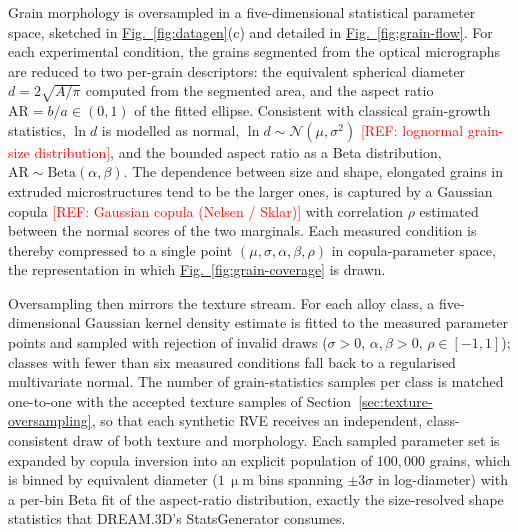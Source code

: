 \documentclass[preprint,12pt]{elsarticle}
\newcommand{\figref}[1]{\hyperref[#1]{Fig.~\ref*{#1}}}
\newcommand{\refneeded}[1]{\textcolor{red}{[REF: #1]}} %
\begin{document}
Grain morphology is oversampled in a five-dimensional statistical parameter space, sketched in \figref{fig:datagen}(c) and detailed in \figref{fig:grain-flow}. For each experimental condition, the grains segmented from the optical micrographs are reduced to two per-grain descriptors: the equivalent spherical diameter $d = 2\sqrt{A/\pi}$ computed from the segmented area, and the aspect ratio $\mathrm{AR} = b/a \in (0,1)$ of the fitted ellipse. Consistent with classical grain-growth statistics, $\ln d$ is modelled as normal, $\ln d \sim \mathcal{N}(\mu, \sigma^2)$ \refneeded{lognormal grain-size distribution}, and the bounded aspect ratio as a Beta distribution, $\mathrm{AR} \sim \mathrm{Beta}(\alpha, \beta)$. The dependence between size and shape, elongated grains in extruded microstructures tend to be the larger ones, is captured by a Gaussian copula \refneeded{Gaussian copula (Nelsen / Sklar)} with correlation $\rho$ estimated between the normal scores of the two marginals. Each measured condition is thereby compressed to a single point $(\mu, \sigma, \alpha, \beta, \rho)$ in copula-parameter space, the representation in which \figref{fig:grain-coverage} is drawn.

Oversampling then mirrors the texture stream. For each alloy class, a five-dimensional Gaussian kernel density estimate is fitted to the measured parameter points and sampled with rejection of invalid draws ($\sigma > 0$, $\alpha, \beta > 0$, $\rho \in [-1, 1]$); classes with fewer than six measured conditions fall back to a regularised multivariate normal. The number of grain-statistics samples per class is matched one-to-one with the accepted texture samples of Section~\ref{sec:texture-oversampling}, so that each synthetic RVE receives an independent, class-consistent draw of both texture and morphology. Each sampled parameter set is expanded by copula inversion into an explicit population of $100{,}000$ grains, which is binned by equivalent diameter ($1\,\upmu\mathrm{m}$ bins spanning $\pm 3\sigma$ in log-diameter) with a per-bin Beta fit of the aspect-ratio distribution, exactly the size-resolved shape statistics that DREAM.3D's StatsGenerator consumes.
\end{document}
